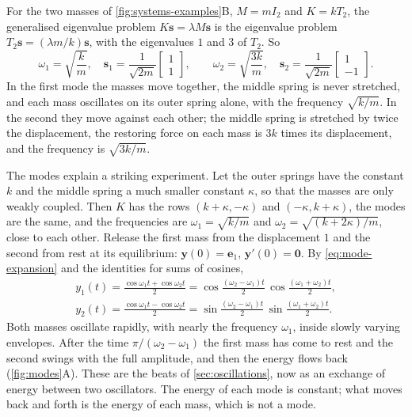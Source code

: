 For the two masses of \cref{fig:systems-examples}B, $M=mI_2$ and $K=kT_2$, the generalised eigenvalue problem $K\mathbf s=\lambda M\mathbf s$ is the eigenvalue problem $T_2\mathbf s=(\lambda m/k)\mathbf s$, with the eigenvalues $1$ and $3$ of $T_2$. So
\[
\omega_1=\sqrt{\frac km},\quad\mathbf s_1=\frac1{\sqrt{2m}}\begin{bmatrix}1\\1\end{bmatrix},\qquad\omega_2=\sqrt{\frac{3k}m},\quad\mathbf s_2=\frac1{\sqrt{2m}}\begin{bmatrix}1\\-1\end{bmatrix}.
\]
In the first mode the masses move together, the middle spring is never stretched, and each mass oscillates on its outer spring alone, with the frequency $\sqrt{k/m}$. In the second they move against each other; the middle spring is stretched by twice the displacement, the restoring force on each mass is $3k$ times its displacement, and the frequency is $\sqrt{3k/m}$.

The modes explain a striking experiment. Let the outer springs have the constant $k$ and the middle spring a much smaller constant $\kappa$, so that the masses are only weakly coupled. Then $K$ has the rows $(k+\kappa,-\kappa)$ and $(-\kappa,k+\kappa)$, the modes are the same, and the frequencies are $\omega_1=\sqrt{k/m}$ and $\omega_2=\sqrt{(k+2\kappa)/m}$, close to each other. Release the first mass from the displacement $1$ and the second from rest at its equilibrium: $\mathbf y(0)=\mathbf e_1$, $\mathbf y'(0)=\mathbf 0$. By \eqref{eq:mode-expansion} and the identities for sums of cosines,
\begin{gather*}
y_1(t)=\frac{\cos\omega_1t+\cos\omega_2t}2=\cos\frac{(\omega_2-\omega_1)t}2\,\cos\frac{(\omega_1+\omega_2)t}2,\\
y_2(t)=\frac{\cos\omega_1t-\cos\omega_2t}2=\sin\frac{(\omega_2-\omega_1)t}2\,\sin\frac{(\omega_1+\omega_2)t}2 .
\end{gather*}
Both masses oscillate rapidly, with nearly the frequency $\omega_1$, inside slowly varying envelopes. After the time $\pi/(\omega_2-\omega_1)$ the first mass has come to rest and the second swings with the full amplitude, and then the energy flows back (\cref{fig:modes}A). These are the beats of \cref{sec:oscillations}, now as an exchange of energy between two oscillators. The energy of each mode is constant; what moves back and forth is the energy of each mass, which is not a mode.

